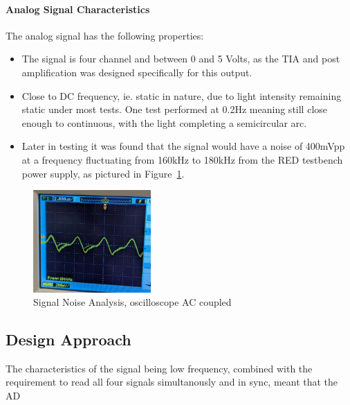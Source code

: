 \paragraph{Analog Signal Characteristics}
The analog signal has the following properties:
\begin{itemize}
    \item The signal is four channel and between 0 and 5 Volts, as the TIA and post amplification was designed specifically for this output.
    \item Close to DC frequency, ie. static in nature, due to light intensity remaining static under most tests. One test performed at 0.2Hz meaning still close enough to continuous, with the light completing a semicircular arc. 
    \item Later in testing it was found that the signal would have a noise of 400mVpp at a frequency fluctuating from 160kHz to 180kHz from the RED testbench power supply, as pictured in Figure~\ref{fig:sigNoise}.
\end{itemize}
\begin{figure}[htbp] 
    \centering
    \includegraphics[width=0.4\textwidth]{chapters/methodology/ArduinoDAQ/signal_noise.png}
    \caption{Signal Noise Analysis, oscilloscope AC coupled}
    \label{fig:sigNoise}
\end{figure}

\subsection{Design Approach}
The characteristics of the signal being low frequency, combined with the requirement to read all four signals simultanously and in sync, meant that the AD

